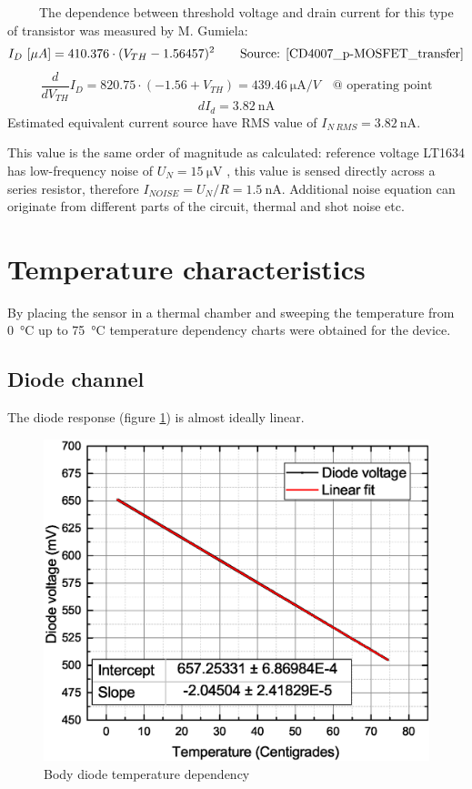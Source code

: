         The dependence between threshold voltage and drain current for this type of transistor was measured by M. Gumiela:
        $$I_D~[\mu A] = 410.376 \cdot (V_{TH} - 1.56457)^2 \text{~~~~~~Source: \ref{CD4007_p-MOSFET_transfer}}$$
        $$\frac{\textit{d}}{\textit{d}V_{TH}} I_D= 820.75 \cdot (-1.56 + V_{TH}) = \SI{439.46}{\uA/V} \text{~~~@ operating point}$$
        $$\textit{d}I_d = \SI{3.82}{\nA}$$
        Estimated equivalent current source have RMS value of $I_{N~RMS} = \SI{3.82}{\nA}$.

        This value is the same order of magnitude as calculated: reference voltage LT1634 has low-frequency noise of $U_N = \SI{15}{\uV}$ \cite{LT1634_datasheet}, this value is sensed directly across a series resistor, therefore $I_{NOISE} = U_N/R = \SI{1.5}{\nA}$. Additional noise equation can originate from different parts of the circuit, thermal and shot noise etc.



\section{Temperature characteristics}
    By placing the sensor in a thermal chamber and sweeping the temperature from \SI{0}{\degreeCelsius} up to \SI{75}{\degreeCelsius} temperature dependency charts were obtained for the device.

    \subsection{Diode channel}
        The diode response (figure \ref{Body_diode_temperature_dependency}) is almost ideally linear.
        \begin{figure}[H]
            \centering
            \includegraphics[width=0.4\paperwidth]{img/07/diodeVsTemperature.eps}
            \caption{Body diode temperature dependency}
            \label{Body_diode_temperature_dependency}
        \end{figure}


